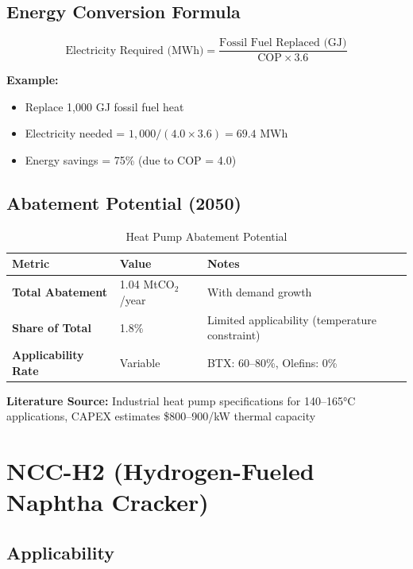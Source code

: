 \documentclass[11pt,a4paper]{report}
\newcommand{\mtco}{MtCO$_2$}
\begin{document}
\subsection{Energy Conversion Formula}

\begin{equation}
\text{Electricity Required (MWh)} = \frac{\text{Fossil Fuel Replaced (GJ)}}{\text{COP} \times 3.6}
\end{equation}

\textbf{Example:}
\begin{itemize}[leftmargin=*]
    \item Replace 1,000 GJ fossil fuel heat
    \item Electricity needed = $1,000 / (4.0 \times 3.6) = 69.4$ MWh
    \item Energy savings = 75\% (due to COP = 4.0)
\end{itemize}

\subsection{Abatement Potential (2050)}

\begin{table}[H]
\centering
\caption{Heat Pump Abatement Potential}
\begin{tabular}{p{6cm}p{4cm}p{5cm}}
\toprule
\textbf{Metric} & \textbf{Value} & \textbf{Notes} \\
\midrule
\textbf{Total Abatement} & 1.04 \mtco/year & With demand growth \\
\textbf{Share of Total} & 1.8\% & Limited applicability (temperature constraint) \\
\textbf{Applicability Rate} & Variable & BTX: 60--80\%, Olefins: 0\% \\
\bottomrule
\end{tabular}
\label{tab:heatpump-abatement}
\end{table}

\textbf{Literature Source:} Industrial heat pump specifications for 140--165°C applications, CAPEX estimates \$800--900/kW thermal capacity

\clearpage

\section{NCC-H2 (Hydrogen-Fueled Naphtha Cracker)}

\subsection{Applicability}
\end{document}

